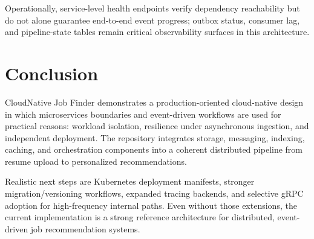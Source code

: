\documentclass[conference]{IEEEtran}
\begin{document}
Operationally, service-level health endpoints verify dependency reachability but do not alone guarantee end-to-end event progress; outbox status, consumer lag, and pipeline-state tables remain critical observability surfaces in this architecture.

\section{Conclusion}
CloudNative Job Finder demonstrates a production-oriented cloud-native design in which microservices boundaries and event-driven workflows are used for practical reasons: workload isolation, resilience under asynchronous ingestion, and independent deployment. The repository integrates storage, messaging, indexing, caching, and orchestration components into a coherent distributed pipeline from resume upload to personalized recommendations.

Realistic next steps are Kubernetes deployment manifests, stronger migration/versioning workflows, expanded tracing backends, and selective gRPC adoption for high-frequency internal paths. Even without those extensions, the current implementation is a strong reference architecture for distributed, event-driven job recommendation systems.
\end{document}
